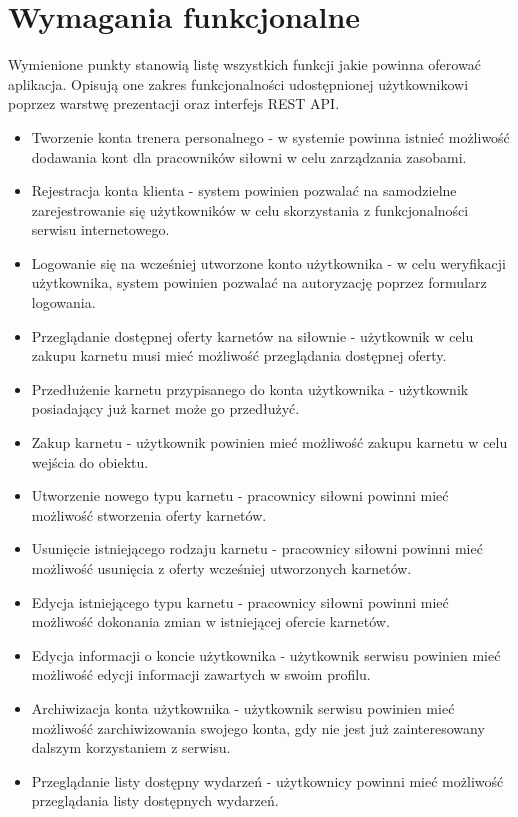 \documentclass[a4paper,twoside,12pt]{book}
\begin{document}
	\section{Wymagania funkcjonalne} 
	Wymienione punkty stanowią listę wszystkich funkcji jakie powinna oferować aplikacja. Opisują one zakres funkcjonalności udostępnionej użytkownikowi poprzez warstwę prezentacji oraz interfejs REST API.
		\begin{itemize}
			\item Tworzenie konta trenera personalnego - w systemie powinna istnieć możliwość dodawania kont dla pracowników siłowni w celu zarządzania zasobami.
			\item Rejestracja konta klienta - system powinien pozwalać na samodzielne zarejestrowanie się użytkowników w celu skorzystania z funkcjonalności serwisu internetowego.
			\item Logowanie się na wcześniej utworzone konto użytkownika - w celu weryfikacji użytkownika, system powinien pozwalać na autoryzację poprzez formularz logowania.
			\item Przeglądanie dostępnej oferty karnetów na siłownie - użytkownik w celu zakupu karnetu musi mieć możliwość przeglądania dostępnej oferty.
			\item Przedłużenie karnetu przypisanego do konta użytkownika - użytkownik posiadający już karnet może go przedłużyć.
			\item Zakup karnetu - użytkownik powinien mieć możliwość zakupu karnetu w celu wejścia do obiektu.
			\item Utworzenie nowego typu karnetu - pracownicy siłowni powinni mieć możliwość stworzenia oferty karnetów.
			\item Usunięcie istniejącego rodzaju karnetu - pracownicy siłowni powinni mieć możliwość usunięcia z oferty wcześniej utworzonych karnetów.
			\item Edycja istniejącego typu karnetu - pracownicy siłowni powinni mieć możliwość dokonania zmian w istniejącej ofercie karnetów.
			\item Edycja informacji o koncie użytkownika - użytkownik serwisu powinien mieć możliwość edycji informacji zawartych w swoim profilu.
			\item Archiwizacja konta użytkownika - użytkownik serwisu powinien mieć możliwość zarchiwizowania swojego konta, gdy nie jest już zainteresowany dalszym korzystaniem z serwisu.
			\item Przeglądanie listy dostępny wydarzeń - użytkownicy powinni mieć możliwość przeglądania listy dostępnych wydarzeń.

\end{itemize}
\end{document}
